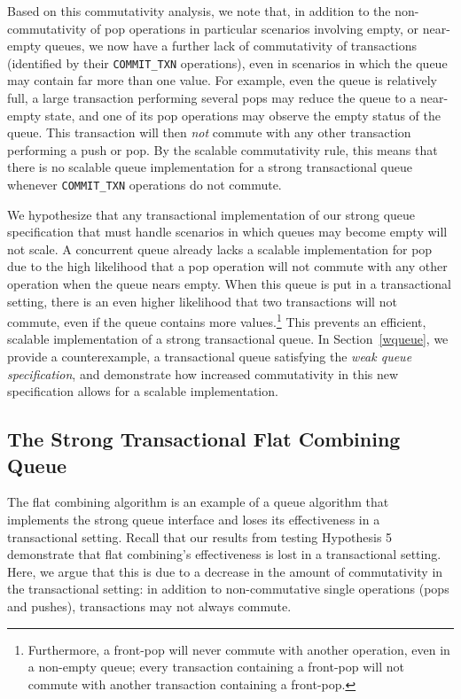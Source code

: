 Based on this commutativity analysis, we note that, in addition to the non-commutativity of pop operations in particular scenarios involving empty, or near-empty queues, we now have a further lack of commutativity of transactions (identified by their \texttt{COMMIT\_TXN} operations), even in scenarios in which the queue may contain far more than one value. For example, even the queue is relatively full, a large transaction performing several pops may reduce the queue to a near-empty state, and one of its pop operations may observe the empty status of the queue. This transaction will then \emph{not} commute with any other transaction performing a push or pop.  By the scalable commutativity rule, this means that there is no scalable queue implementation for a strong transactional queue whenever \texttt{COMMIT\_TXN} operations do not commute.

We hypothesize that any transactional implementation of our strong queue specification that must handle scenarios in which queues may become empty will not scale. A concurrent queue already lacks a scalable implementation for pop due to the high likelihood that a pop operation will not commute with any other operation when the queue nears empty. When this queue is put in a transactional setting, there is an even higher likelihood that two transactions will not commute, even if the queue contains more values.\footnote{Furthermore, a front-pop will never commute with another operation, even in a non-empty queue; every transaction containing a front-pop will not commute with another transaction containing a front-pop.}
This prevents an efficient, scalable implementation of a strong transactional queue. In Section~\ref{wqueue}, we provide a counterexample, a transactional queue satisfying the \emph{weak queue specification}, and demonstrate how increased commutativity in this new specification allows for a scalable implementation.

\subsection{The Strong Transactional Flat Combining Queue}
The flat combining algorithm is an example of a queue algorithm that implements the strong queue interface and loses its effectiveness in a transactional setting. Recall that our results from testing Hypothesis 5 demonstrate that flat combining's effectiveness is lost in a transactional setting. Here, we argue that this is due to a decrease in the amount of commutativity in the transactional setting: in addition to non-commutative single operations (pops and pushes), transactions may not always commute.

